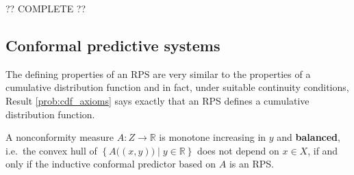     ?? COMPLETE ??

\subsection{Conformal predictive systems}


    The defining properties of an RPS are very similar to the properties of a cumulative distribution function and in fact, under suitable continuity conditions, Result \ref{prob:cdf_axioms} says exactly that an RPS defines a cumulative distribution function.


    \begin{property}
        A nonconformity measure $A:Z\rightarrow\mathbb{R}$ is monotone increasing in $y$ and \textbf{balanced}, i.e.~the convex hull of $\left\{A\big((x,y)\big)\mid y\in\mathbb{R}\right\}$ does not depend on $x\in X$, if and only if the inductive conformal predictor based on $A$ is an RPS.
    \end{property}

